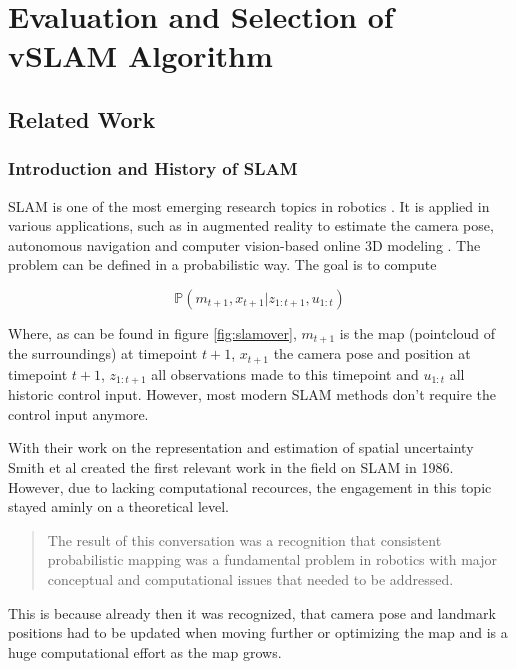 \chapter{Evaluation and Selection of vSLAM Algorithm}
\section{Related Work}

\subsection{Introduction and History of SLAM}

SLAM is one of the most emerging research topics in robotics \cite{slamintro}. It is applied in various applications, such as in augmented reality to estimate the camera pose,
autonomous navigation and computer vision-based online 3D modeling \cite{evolved} \cite{dso}.
The problem can be defined in a probabilistic way. The goal is to compute 

$$\mathbb{P}\left(m_{t+1},x_{t+1}|z_{1:t+1},u_{1:t}\right)$$

Where, as can be found in figure \ref{fig:slamover}, $m_{t+1}$ is the map (pointcloud of the surroundings) at timepoint $t+1$, $x_{t+1}$ the 
camera pose and position at timepoint $t+1$, $z_{1:t+1}$ all observations made to this timepoint and $u_{1:t}$ all historic control input. However, most
modern SLAM methods don't require the control input anymore. 


With their work on the representation and estimation of spatial uncertainty \cite{hist1}
Smith et al created the first relevant work in the field on SLAM in 1986. However, due to lacking computational recources, the engagement in this topic stayed aminly
on a theoretical level. 


  \begin{quote}
   The result of this conversation was a recognition that
	consistent probabilistic mapping was a fundamental problem
	in robotics with major conceptual and computational issues
	that needed to be addressed. \cite{hist2}
  \end{quote}
  
This is because already then it was recognized, that camera pose and landmark positions had to be updated when moving further or optimizing the map and is a huge computational 
effort as the map grows. 

